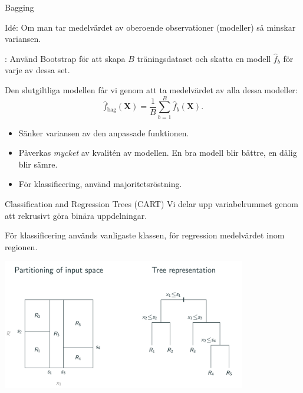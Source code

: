 \documentclass[10pt,english]{beamer}
\begin{document}
\begin{frame}{Bagging}
    
    Idé: Om man tar medelvärdet av oberoende observationer (modeller) så minskar variansen.

    \begin{bluebox}
        : Använd Bootstrap för att skapa $B$ träningsdataset och skatta en modell $\hat{f}_b$ för varje av dessa set.

        Den slutgiltliga modellen får vi genom att ta medelvärdet av alla dessa modeller:
        \begin{equation*}
            \hat{f}_{\text{bag}}(\mathbf{X}) = \frac{1}{B}\sum_{b=1}^{B}\hat{f}_b(\mathbf{X}).
        \end{equation*}
    \end{bluebox}

    \begin{itemize}
        \item Sänker variansen av den anpassade funktionen.
        \item Påverkas \emph{mycket} av kvalitén av modellen. En bra modell blir bättre, en dålig blir sämre.
        \item För klassificering, använd majoritetsröstning.
    \end{itemize}

\end{frame}

\begin{frame}{Classification and Regression Trees (CART)}
    Vi delar upp variabelrummet genom att rekrusivt göra binära uppdelningar.

    För klassificering används vanligaste klassen, för regression medelvärdet inom regionen.

    \includegraphics[width=0.8\textwidth]{figs/tree_fredrik.png}
\end{frame}
\end{document}
